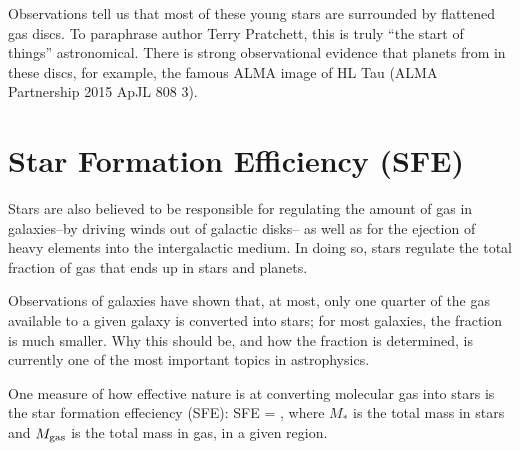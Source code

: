 \documentclass[../dissertation.tex]{subfiles}
\begin{document}
Observations tell us that most of these young stars are surrounded by flattened gas discs. To paraphrase author Terry Pratchett, this is truly ``the start of things'' astronomical. 
There is strong observational evidence that planets from in these discs, for example, the famous ALMA image of HL Tau (ALMA Partnership 2015 ApJL 808 3).



\section{Star Formation Efficiency (SFE)}

 Stars are also believed to be responsible for regulating the amount of gas in galaxies--by driving winds out of galactic disks-- as well as for the ejection of heavy elements into the intergalactic
medium.  In doing so, stars regulate the total fraction of gas that ends up in stars and planets. 
 
Observations of galaxies have shown that, at most, only one quarter of the gas available to a given galaxy is converted into stars; for most galaxies, the fraction is much smaller. 
Why this should be, and how the fraction is determined, is currently one of the most important topics in astrophysics.

One measure of how effective nature is at converting molecular gas into stars is the star formation effeciency (SFE):
%
\be
{\rm SFE} = ,
\ee
%
where $M_*$ is the total mass in stars and $M_{\rm gas}$ is the total mass in gas, in a given region.
\end{document}
